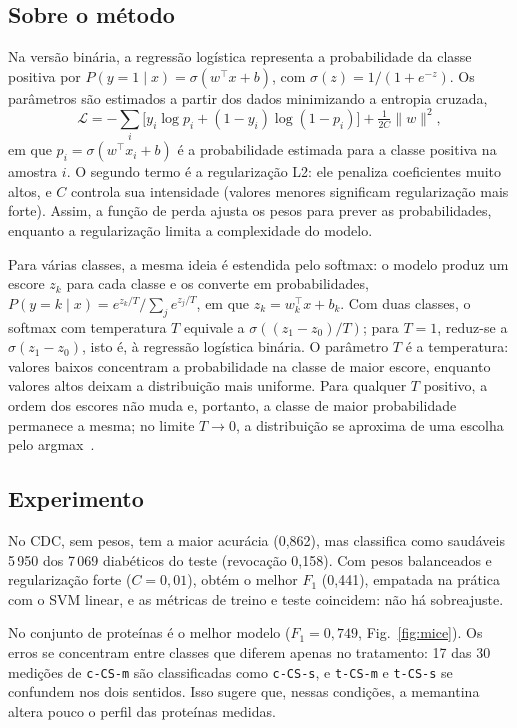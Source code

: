 \documentclass[aps,pre,twocolumn,10pt,nofootinbib]{revtex4-2}
\begin{document}
\subsection{Sobre o método}
Na versão binária, a regressão logística representa a probabilidade da
classe positiva por
$P(y=1\mid x) = \sigma(w^\top x + b)$, com
$\sigma(z) = 1/(1+e^{-z})$. Os parâmetros são estimados a partir dos dados
minimizando a entropia cruzada,
\begin{equation}
\mathcal{L} = -\sum_i \bigl[y_i \log p_i + (1-y_i)\log(1-p_i)\bigr]
+ \tfrac{1}{2C}\lVert w\rVert^2 ,
\end{equation}
em que $p_i = \sigma(w^\top x_i + b)$ é a probabilidade estimada para a
classe positiva na amostra $i$. O segundo termo é a regularização L2: ele
penaliza coeficientes muito altos, e $C$ controla sua intensidade (valores
menores significam regularização mais forte). Assim, a função de perda
ajusta os pesos para prever as probabilidades, enquanto a regularização
limita a complexidade do modelo.

Para várias classes, a mesma ideia é estendida pelo softmax: o modelo
produz um escore $z_k$ para cada classe e os converte em probabilidades,
$P(y=k\mid x) = e^{z_k/T}/\sum_j e^{z_j/T}$, em que
$z_k = w_k^\top x + b_k$. Com duas classes, o softmax com temperatura $T$
equivale a $\sigma((z_1-z_0)/T)$; para $T=1$, reduz-se a
$\sigma(z_1-z_0)$, isto é, à regressão logística binária. O parâmetro $T$
é a temperatura: valores baixos concentram a probabilidade na classe de
maior escore, enquanto valores altos deixam a distribuição mais uniforme.
Para qualquer $T$ positivo, a ordem dos escores não muda e, portanto, a
classe de maior probabilidade permanece a mesma; no limite $T\to 0$, a
distribuição se aproxima de uma escolha pelo argmax~\cite{d2l}.

\subsection{Experimento}
No CDC, sem pesos, tem a maior acurácia (0,862), mas classifica como
saudáveis 5\,950 dos 7\,069 diabéticos do teste (revocação 0,158). Com
pesos balanceados e regularização forte ($C=0{,}01$), obtém o melhor $F_1$
(0,441), empatada na prática com o SVM linear, e as métricas de treino e
teste coincidem: não há sobreajuste.

No conjunto de proteínas é o melhor modelo ($F_1 = 0{,}749$,
Fig.~\ref{fig:mice}). Os erros se concentram entre classes que diferem
apenas no tratamento: 17 das 30 medições de \texttt{c-CS-m} são
classificadas como \texttt{c-CS-s}, e \texttt{t-CS-m} e \texttt{t-CS-s} se
confundem nos dois sentidos. Isso sugere que, nessas condições, a memantina
altera pouco o perfil das proteínas medidas.
\end{document}
